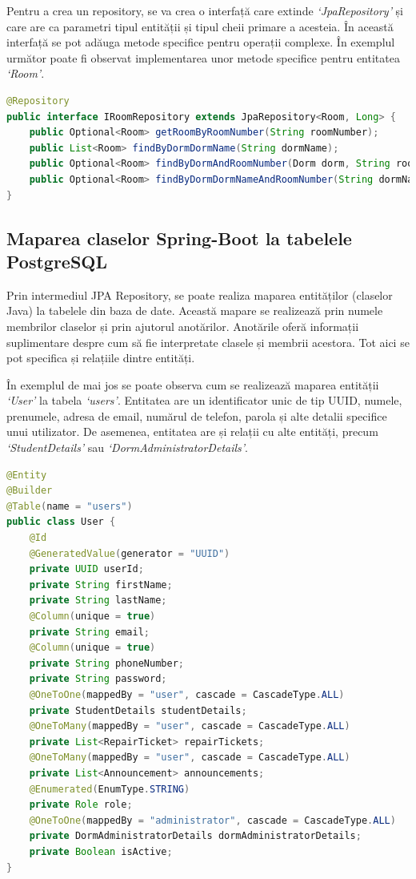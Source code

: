 \documentclass[12pt,a4paper]{report}
\theoremstyle{definition}
\theoremstyle{remark}
\begin{document}
\par Pentru a crea un repository, se va crea o interfață care extinde \textit{`JpaRepository'} și care are ca parametri tipul entității și tipul cheii primare a acesteia. În această interfață se pot adăuga metode specifice pentru operații complexe. În exemplul următor poate fi observat implementarea unor metode specifice pentru entitatea \textit{`Room'}.

\begin{lstlisting}[language=Java, caption={Interfața JPA Repository pentru entitatea Room}]
@Repository
public interface IRoomRepository extends JpaRepository<Room, Long> {
    public Optional<Room> getRoomByRoomNumber(String roomNumber);
    public List<Room> findByDormDormName(String dormName);
    public Optional<Room> findByDormAndRoomNumber(Dorm dorm, String roomNumber);
    public Optional<Room> findByDormDormNameAndRoomNumber(String dormName, String roomNumber);
}
\end{lstlisting}

\subsection{Maparea claselor Spring-Boot la tabelele PostgreSQL}

\par Prin intermediul JPA Repository, se poate realiza maparea entităților (claselor Java) la tabelele din baza de date. Această mapare se realizează prin numele membrilor claselor și prin ajutorul anotărilor. Anotările oferă informații suplimentare despre cum să fie interpretate clasele și membrii acestora. Tot aici se pot specifica și relațiile dintre entități.

\par În exemplul de mai jos se poate observa cum se realizează maparea entității \textit{`User'} la tabela \textit{`users'}. Entitatea are un identificator unic de tip UUID, numele, prenumele, adresa de email, numărul de telefon, parola și alte detalii specifice unui utilizator. De asemenea, entitatea are și relații cu alte entități, precum \textit{`StudentDetails'} sau \textit{`DormAdministratorDetails'}.

\begin{lstlisting}[language=Java, caption={Clasa User}]
@Entity
@Builder
@Table(name = "users")
public class User {
    @Id
    @GeneratedValue(generator = "UUID")
    private UUID userId;
    private String firstName;
    private String lastName;
    @Column(unique = true)
    private String email;
    @Column(unique = true)
    private String phoneNumber;
    private String password;
    @OneToOne(mappedBy = "user", cascade = CascadeType.ALL)
    private StudentDetails studentDetails;
    @OneToMany(mappedBy = "user", cascade = CascadeType.ALL)
    private List<RepairTicket> repairTickets;
    @OneToMany(mappedBy = "user", cascade = CascadeType.ALL)
    private List<Announcement> announcements;
    @Enumerated(EnumType.STRING)
    private Role role;
    @OneToOne(mappedBy = "administrator", cascade = CascadeType.ALL)
    private DormAdministratorDetails dormAdministratorDetails;
    private Boolean isActive;
}
\end{lstlisting}
\end{document}
